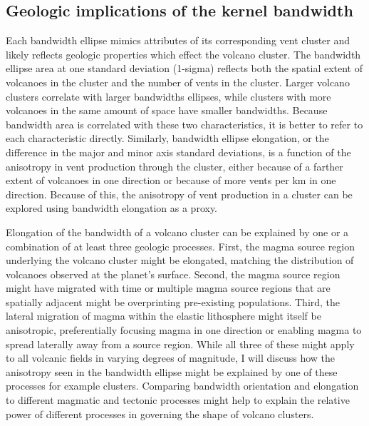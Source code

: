 



\subsection{Geologic implications of the kernel bandwidth}
Each bandwidth ellipse mimics attributes of its corresponding vent cluster and likely reflects geologic properties which effect the volcano cluster. The bandwidth ellipse area at one standard deviation (1-sigma) reflects both the spatial extent of volcanoes in the cluster and the number of vents in the cluster. Larger volcano clusters correlate with larger bandwidths ellipses, while clusters with more volcanoes in the same amount of space have smaller bandwidths. Because bandwidth area is correlated with these two characteristics, it is better to refer to each characteristic directly. Similarly, bandwidth ellipse elongation, or the difference in the major and minor axis standard deviations, is a function of the anisotropy in vent production through the cluster, either because of a farther extent of volcanoes in one direction or because of more vents per km in one direction. Because of this, the anisotropy of vent production in a cluster can be explored using bandwidth elongation as a proxy.

Elongation of the bandwidth of a volcano cluster can be explained by one or a combination of at least three geologic processes. First, the magma source region underlying the volcano cluster might be elongated, matching the distribution of volcanoes observed at the planet's surface. Second, the magma source region might have migrated with time or multiple magma source regions that are spatially adjacent might be overprinting pre-existing populations. Third, the lateral migration of magma within the elastic lithosphere might itself be anisotropic, preferentially focusing magma in one direction or enabling magma to spread laterally away from a source region. While all three of these might apply to all volcanic fields in varying degrees of magnitude, I will discuss how the anisotropy seen in the bandwidth ellipse might be explained by one of these processes for example clusters. Comparing bandwidth orientation and elongation to different magmatic and tectonic processes might help to explain the relative power of different processes in governing the shape of volcano clusters.

